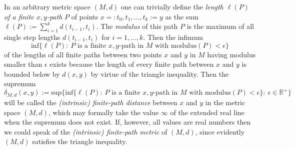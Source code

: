 \documentclass[11pt,a4paper]{amsart}
\theoremstyle{definition}
\numberwithin{equation}{section}
\newcommand{\MM}{\ensuremath{M}}
\begin{document}
In an  arbitrary metric space $(\MM,d)$ one can trivially define the {\it length $\ell (P)$ of a finite $x,y$-path}
$P$ of points  $x =: t_0, t_1,\ldots, t_k := y$ as the sum
$\ell(P):=\sum_{i=1}^k d(t_{i-1},t_i).$
The {\it modulus} of this path $P$ is the maximum of all single step lengths $d(t_{i-1},t_i)$ for $i=1,...,k.$ Then the infimum
$$\mbox{inf} \{ \ell(P): ~P \mbox{ is a finite } x,y\mbox{-path in } \MM \mbox{ with modulus}(P) <\epsilon\}$$
of the lengths of all finite paths between two points $x$ and $y$ in $\MM$ having modulus smaller than $\epsilon$ exists because the
length of every finite path between $x$ and $y$ is bounded below by $d(x,y)$ by virtue of the triangle inequality. Then the supremum
$$\delta_{\MM,d}(x,y):=\mbox{sup}\{\mbox{inf}\{ \ell(P): ~P \mbox{ is a finite } x,y\mbox{-path in } \MM \mbox{ with modulus}(P)<\epsilon\}: ~\epsilon\in\mathbb{R}^+\}$$
will be called the {\it (intrinsic) finite-path distance} between $x$ and $y$ in the metric space $(\MM,d)$, which may formally take
the value $\infty$ of the extended real line when the supremum does not exist. If, however, all values
are real numbers then we could speak of the {\it (intrinsic) finite-path metric} of $(\MM,d)$, since evidently $(\MM,d)$ satisfies the triangle inequality.
\end{document}
